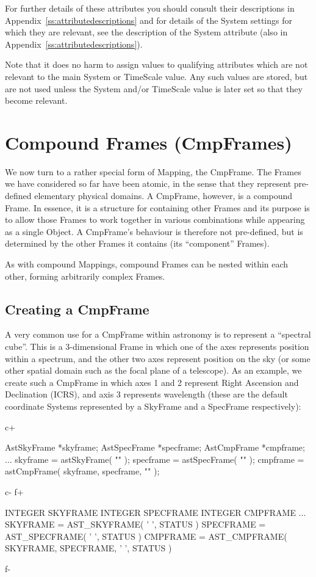 \documentclass[twoside,11pt]{starlink}
\providecommand{\appref}[1]{Appendix~\ref{#1}}
\begin{document}
For further details of these attributes you should consult their
descriptions in \appref{ss:attributedescriptions} and for details of
the System settings for which they are relevant, see the description
of the System attribute (also in \appref{ss:attributedescriptions}).

Note that it does no harm to assign values to qualifying attributes
which are not relevant to the main System or TimeScale value. Any such
values are stored, but are not used unless the System and/or TimeScale
value is later set so that they become relevant.

\cleardoublepage
\section{\label{ss:cmpframes}Compound Frames (CmpFrames)}

We now turn to a rather special form of Mapping, the CmpFrame. The
Frames we have considered so far have been atomic, in the sense that
they represent pre-defined elementary physical domains. A CmpFrame,
however, is a compound Frame. In essence, it is a structure for
containing other Frames and its purpose is to allow those Frames
to work together in various combinations while appearing as a single
Object. A CmpFrame's behaviour is therefore not pre-defined, but is
determined by the other Frames it contains (its ``component'' Frames).

As with compound Mappings, compound Frames can be nested within each
other, forming arbitrarily complex Frames.

\subsection{Creating a CmpFrame}
A very common use for a CmpFrame within astronomy is to represent a
``spectral cube''. This is a 3-dimensional Frame in which one of the axes
represents position within a spectrum, and the other two axes represent
position on the sky (or some other spatial domain such as the focal plane
of a telescope). As an example, we create such a CmpFrame in which axes
1 and 2 represent Right Ascension and Declination (ICRS), and axis 3
represents wavelength (these are the default coordinate Systems
represented by a SkyFrame and a SpecFrame respectively):

c+
\small
\begin{terminalv}
AstSkyFrame *skyframe;
AstSpecFrame *specframe;
AstCmpFrame *cmpframe;
...
skyframe = astSkyFrame( "" );
specframe = astSpecFrame( "" );
cmpframe = astCmpFrame( skyframe, specframe, "" );
\end{terminalv}
\normalsize
c-
f+
\small
\begin{terminalv}
      INTEGER SKYFRAME
      INTEGER SPECFRAME
      INTEGER CMPFRAME
      ...
      SKYFRAME = AST_SKYFRAME( ' ', STATUS )
      SPECFRAME = AST_SPECFRAME( ' ', STATUS )
      CMPFRAME = AST_CMPFRAME( SKYFRAME, SPECFRAME, ' ', STATUS )
\end{terminalv}
\normalsize
f-
\end{document}
